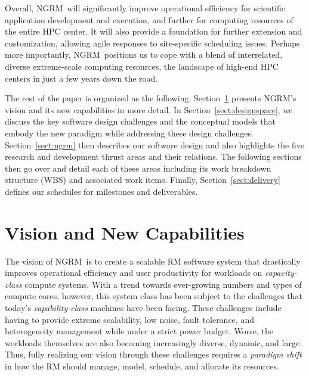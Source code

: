 \documentclass{article}
\newcommand{\ngrm}{NGRM}
\begin{document}
Overall, \ngrm\ will significantly improve operational efficiency for
scientific application development and execution, and further for computing
resources of the entire HPC center.  It will also provide
a foundation for further extension and customization, allowing agile responses
to site-specific scheduling issues. Perhaps more importantly, \ngrm\
positions us to cope with a blend of interrelated, diverse
extreme-scale computing resources, the landscape of high-end HPC centers
in just a few years down the road.

The rest of the paper is organized as the following.
Section~\ref{sect:vision} presents \ngrm's vision and 
its new capabilities in more detail. 
In Section~\ref{sect:designspace}, we discuss 
the key software design challenges and the conceptual models
that embody the new paradigm while addressing these design challenges. 
Section~\ref{sect:ngrm} then describes our software design
and also highlights the five research and development thrust areas
and their relations. 
The following sections then go over and detail each of these areas including 
its work breakdown structure (WBS) and associated work items.
Finally, Section~\ref{sect:delivery} defines
our schedules for milestones and deliverables.


\section{Vision and New Capabilities}
\label{sect:vision}

The vision of \ngrm\ is to create a scalable RM software system that 
drastically improves operational efficiency and user productivity 
for workloads on {\em capacity-class} compute systems.
With a trend towards ever-growing numbers and types of compute cores, however,
this system class has been subject to the challenges that
today's {\em capability-class} machines have been facing. 
These challenges include having to provide extreme scalability, low noise, 
fault tolerance, and heterogeneity management while under a strict power budget.
Worse, the workloads themselves are also becoming increasingly diverse, 
dynamic, and large. Thus, fully realizing our vision through these challenges requires
a {\em paradigm shift} in how the RM should manage, model, schedule,
and allocate its resources.
\end{document}
